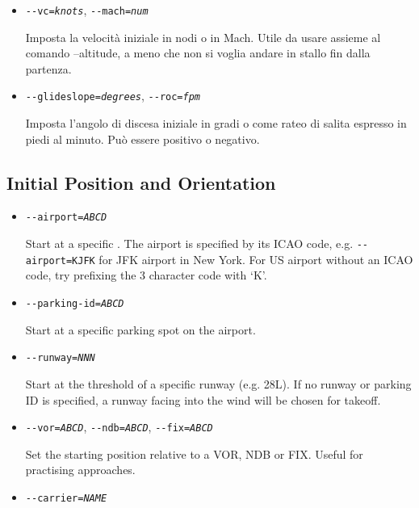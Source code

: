 {\begin{itemize}
  \item{\texttt{-$ $-vc={\it knots}}, \texttt{-$ $-mach={\it num}}}

  Imposta la velocit\`{a} iniziale in nodi o in Mach. Utile da usare assieme al comando --altitude, a meno che non
  si voglia andare in stallo fin dalla partenza.

  \item{\texttt{-$ $-glideslope={\it degrees}}, \texttt{-$ $-roc={\it fpm}}}

  Imposta l'angolo di discesa iniziale in gradi o come rateo di salita espresso in piedi al minuto.
  Pu\`{o} essere positivo o negativo.

  \end{itemize}
}
{
  \subsection{Initial Position and Orientation\label{aiportid}}
  \begin{itemize}
  \item{\texttt{-$ $-airport={\it ABCD}}}

  Start at a specific . The airport is specified by its ICAO code, e.g. \texttt{-$ $-airport=KJFK} for
  JFK airport in New York. For US airport without an ICAO code, try prefixing the 3 character code
  with `K'.

  \item{\texttt{-$ $-parking-id={\it ABCD}}}

  Start at a specific parking spot on the airport.

  \item{\texttt{-$ $-runway={\it NNN}}}

  Start at the threshold of a specific runway (e.g. 28L). If no runway or parking ID is
  specified, a runway facing into the wind will be chosen for takeoff.

  \item{\texttt{-$ $-vor={\it ABCD}}, \texttt{-$ $-ndb={\it ABCD}}, \texttt{-$ $-fix={\it ABCD}}}

  Set the starting position relative to a VOR, NDB or FIX. Useful for practising approaches.

  \item{\texttt{-$ $-carrier={\it NAME}}}


\end{itemize}}

